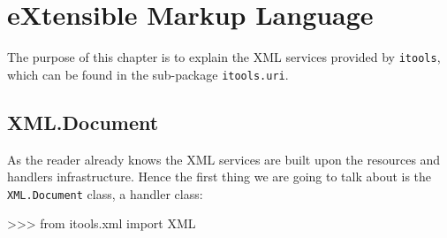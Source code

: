 \chapter{eXtensible Markup Language}

The purpose of this chapter is to explain the XML services provided by
{\tt itools}, which can be found in the sub-package {\tt itools.uri}.

\section{XML.Document}

As the reader already knows the XML services are built upon the resources
and handlers infrastructure. Hence the first thing we are going to talk
about is the {\tt XML.Document} class, a handler class:

\begin{code}
    >>> from itools.xml import XML
\end{code}